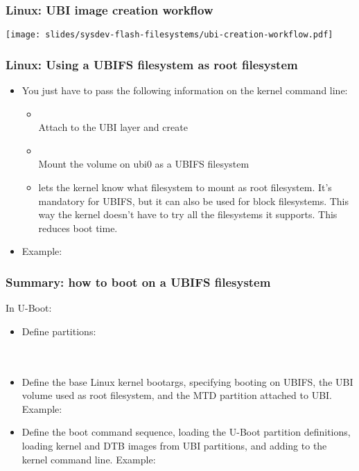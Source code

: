 \begin{frame}
  \frametitle{Linux: UBI image creation workflow}
  \begin{center}
    \texttt{[image: slides/sysdev-flash-filesystems/ubi-creation-workflow.pdf]}
  \end{center}
\end{frame}

\begin{frame}
  \frametitle{Linux: Using a UBIFS filesystem as root filesystem}
  \begin{itemize}
  \item You just have to pass the following information on the kernel
    command line:
    \begin{itemize}
    \item {}\\
      Attach  to the UBI layer and create 
    \item {}\\
      Mount the  volume on ubi0 as a UBIFS filesystem
    \item {} lets the kernel know what filesystem
      to mount as root filesystem. It's mandatory for UBIFS, but
      it can also be used for block filesystems. This way the kernel
      doesn't have to try all the filesystems it supports. This reduces
      boot time.
    \end{itemize}
  \item Example: 
  \end{itemize}
\end{frame}

\begin{frame}
  \frametitle{Summary: how to boot on a UBIFS filesystem}
  In U-Boot:
  \begin{itemize}
  \item Define partitions:\\
     \\
     \\
  \item Define the base Linux kernel bootargs, specifying booting
     on UBIFS, the UBI volume used as root filesystem, and the MTD
     partition attached to UBI. Example:\\
     {\footnotesize {}}
  \item Define the boot command sequence, loading the U-Boot partition
     definitions, loading kernel and DTB images from UBI partitions,
     and adding  to the kernel command
     line. Example:\\
  \end{itemize}
\end{frame}

